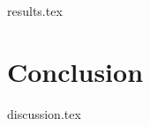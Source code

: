 \documentclass[a4paper,11pt,twoside]{report}
\begin{document}
{results.tex}





\chapter{Conclusion}




{discussion.tex}


\end{document}
